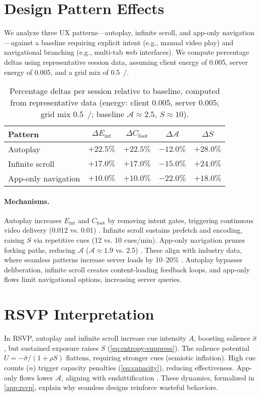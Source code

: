 \documentclass[openany]{book}
\newcommand{\Sent}{S} %
\newcommand{\Eint}{E_{\mathrm{int}}} %
\newcommand{\Cfoot}{C_{\mathrm{foot}}} %
\newcommand{\Auton}{\mathcal{A}} %
\newcommand{\kWh}{\mathrm{kWh}}
\begin{document}
\section{Design Pattern Effects}
\label{sec:pattern-effects}
We analyze three UX patterns---autoplay, infinite scroll, and app-only navigation---against a baseline requiring explicit intent (e.g., manual video play) and navigational branching (e.g., multi-tab web interfaces). We compute percentage deltas using representative session data, assuming client energy of \SI{0.005}{\kWh}, server energy of \SI{0.005}{\kWh}, and a grid mix of \SI{0.5}{\kgCOe/\kWh}.

\begin{table}[h]
\centering
\begin{tabular}{lcccc}
\hline
\textbf{Pattern} & $\Delta \Eint$ & $\Delta \Cfoot$ & $\Delta \Auton$ & $\Delta \Sent$ \\
\hline
Autoplay & $+22.5\%$ & $+22.5\%$ & $-12.0\%$ & $+28.0\%$ \\
Infinite scroll & $+17.0\%$ & $+17.0\%$ & $-15.0\%$ & $+24.0\%$ \\
App-only navigation & $+10.0\%$ & $+10.0\%$ & $-22.0\%$ & $+18.0\%$ \\
\hline
\end{tabular}
\caption{Percentage deltas per session relative to baseline, computed from representative data (energy: client \SI{0.005}{\kWh}, server \SI{0.005}{\kWh}; grid mix \SI{0.5}{\kgCOe/\kWh}; baseline $\Auton \approx 2.5$, $\Sent \approx 10$).}
\label{tab:deltas}
\end{table}

\paragraph{Mechanisms.}
Autoplay increases \(\Eint\) and \(\Cfoot\) by removing intent gates, triggering continuous video delivery (\SI{0.012}{\kWh} vs. \SI{0.01}{\kWh}) \citep{extentia2024}. Infinite scroll sustains prefetch and encoding, raising \(\Sent\) via repetitive cues (12 vs. 10 cues/min). App-only navigation prunes forking paths, reducing \(\Auton\) (\(\Auton \approx 1.9\) vs. 2.5) \citep{doctorow2022}. These align with industry data, where seamless patterns increase server loads by 10--20\% \citep{colak2024}. Autoplay bypasses deliberation, infinite scroll creates content-loading feedback loops, and app-only flows limit navigational options, increasing server queries.

\section{RSVP Interpretation}
\label{sec:hidden-rsvp}
In RSVP, autoplay and infinite scroll increase cue intensity \(A\), boosting salience \(\widehat{\sigma}\), but sustained exposure raises \(\Sent\) (\cref{eq:entropy-suppress}). The salience potential \(U = -\widehat{\sigma}/(1+\rho \Sent)\) flattens, requiring stronger cues (semiotic inflation). High cue counts (\(n\)) trigger capacity penalties (\cref{eq:capacity}), reducing effectiveness. App-only flows lower \(\Auton\), aligning with enshittification \citep{doctorow2022}. These dynamics, formalized in \cref{app:rsvp}, explain why seamless designs reinforce wasteful behaviors.
\end{document}
